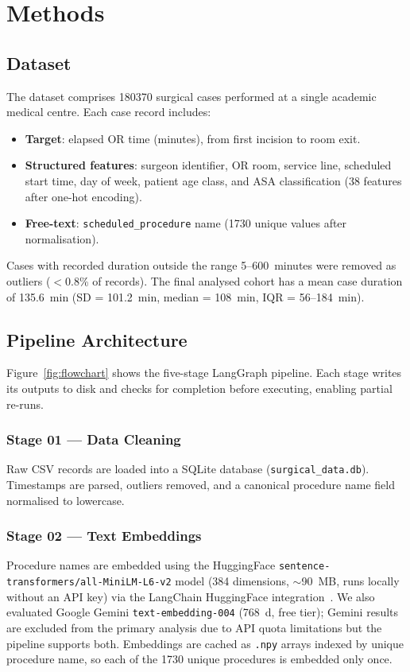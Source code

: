 \documentclass[11pt,twocolumn]{article}
\begin{document}
\section{Methods}
\label{sec:methods}

\subsection{Dataset}
\label{sec:data}

The dataset comprises \num{180370} surgical cases performed at a single academic
medical centre.  Each case record includes:
\begin{itemize}
  \item \textbf{Target}: elapsed OR time (minutes), from first incision to room
        exit.
  \item \textbf{Structured features}: surgeon identifier, OR room, service line,
        scheduled start time, day of week, patient age class, and ASA
        classification (38 features after one-hot encoding).
  \item \textbf{Free-text}: \texttt{scheduled\_procedure} name (\num{1730} unique
        values after normalisation).
\end{itemize}

Cases with recorded duration outside the range 5--600~minutes were removed as
outliers ($<$0.8\% of records).  The final analysed cohort has a mean case
duration of 135.6~min (SD = 101.2~min, median = 108~min, IQR = 56--184~min).

\subsection{Pipeline Architecture}
\label{sec:pipeline}

Figure~\ref{fig:flowchart} shows the five-stage LangGraph pipeline.  Each stage
writes its outputs to disk and checks for completion before executing, enabling
partial re-runs.

\subsubsection{Stage 01 — Data Cleaning}
Raw CSV records are loaded into a SQLite database (\texttt{surgical\_data.db}).
Timestamps are parsed, outliers removed, and a canonical procedure name field
normalised to lowercase.

\subsubsection{Stage 02 — Text Embeddings}
Procedure names are embedded using the HuggingFace
\texttt{sentence-transformers/all-MiniLM-L6-v2} model (384 dimensions, $\sim$90~MB,
runs locally without an API key) via the LangChain HuggingFace
integration~\cite{langchain2024}.  We also evaluated Google Gemini
\texttt{text-embedding-004} (768~d, free tier); Gemini results are excluded from
the primary analysis due to API quota limitations but the pipeline supports both.
Embeddings are cached as \texttt{.npy} arrays indexed by unique procedure name,
so each of the \num{1730} unique procedures is embedded only once.
\end{document}
